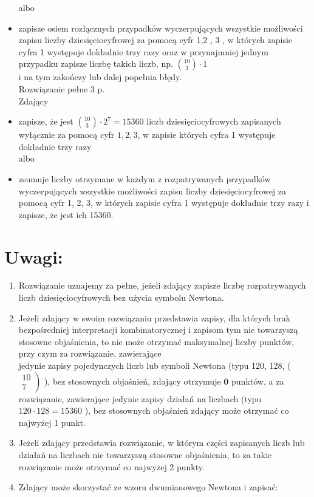 \documentclass[10pt]{article}
\begin{document}
\begin{itemize}
albo
  \item zapisze osiem rozłącznych przypadków wyczerpujących wszystkie możliwości zapisu liczby dziesięciocyfrowej za pomocą cyfr 1,2 , 3 , w których zapisie cyfra 1 występuje dokładnie trzy razy oraz w przynajmniej jednym przypadku zapisze liczbę takich liczb, np. $\binom{10}{3} \cdot 1$\\
i na tym zakończy lub dalej popełnia błędy.\\
Rozwiązanie pełne 3 p.\\
Zdający
  \item zapisze, że jest $\binom{10}{3} \cdot 2^{7}=15360$ liczb dziesięciocyfrowych zapisanych wyłącznie za pomocą cyfr $1,2,3$, w zapisie których cyfra 1 występuje dokładnie trzy razy\\
albo
  \item zsumuje liczby otrzymane w każdym z rozpatrywanych przypadków wyczerpujących wszystkie możliwości zapisu liczby dziesięciocyfrowej za pomocą cyfr 1, 2, 3, w których zapisie cyfra 1 występuje dokładnie trzy razy i zapisze, że jest ich 15360.
\end{itemize}

\section*{Uwagi:}
\begin{enumerate}
  \item Rozwiązanie uznajemy za pełne, jeżeli zdający zapisze liczbę rozpatrywanych liczb dziesięciocyfrowych bez użycia symbolu Newtona.
  \item Jeżeli zdający w swoim rozwiązaniu przedstawia zapisy, dla których brak bezpośredniej interpretacji kombinatorycznej i zapisom tym nie towarzyszą stosowne objaśnienia, to nie może otrzymać maksymalnej liczby punktów, przy czym za rozwiązanie, zawierające\\
jedynie zapisy pojedynczych liczb lub symboli Newtona (typu 120, 128, ( $\left.\begin{array}{c}10 \\ 7\end{array}\right)$ ), bez stosownych objaśnień, zdający otrzymuje $\mathbf{0}$ punktów, a za rozwiązanie, zawierające jedynie zapisy działań na liczbach (typu $120 \cdot 128=15360$ ), bez stosownych objaśnień zdający może otrzymać co najwyżej 1 punkt.
  \item Jeżeli zdający przedstawia rozwiązanie, w którym części zapisanych liczb lub działań na liczbach nie towarzyszą stosowne objaśnienia, to za takie rozwiązanie może otrzymać co najwyżej 2 punkty.
  \item Zdający może skorzystać ze wzoru dwumianowego Newtona i zapisać:
\end{enumerate}
\end{document}
